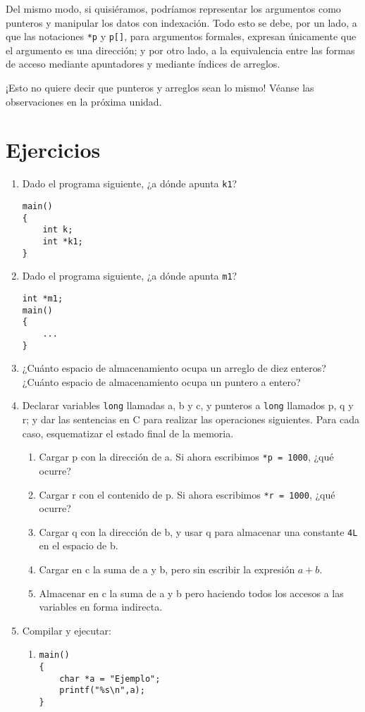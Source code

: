 Del mismo modo, si quisiéramos, podríamos representar los argumentos como
punteros y manipular los datos con indexación. Todo esto se debe, por un lado,
a que las notaciones \texttt{*p} y \texttt{p[]}, para argumentos formales, expresan únicamente que
el argumento es una dirección; y por otro lado, a la equivalencia entre las
formas de acceso mediante apuntadores y mediante índices de arreglos.

¡Esto no quiere decir que punteros y arreglos sean lo mismo! Véanse las
observaciones en la próxima unidad.

\section{Ejercicios}

\begin{enumerate}
	\item Dado el programa siguiente, ¿a dónde apunta \texttt{k1}?
\begin{lstlisting}
main()
{
    int k;
    int *k1;
}
\end{lstlisting}
	\item Dado el programa siguiente, ¿a dónde apunta \texttt{m1}?
\begin{lstlisting}
int *m1;
main()
{
    ...
}	
\end{lstlisting}
	\item ¿Cuánto espacio de almacenamiento ocupa un arreglo de diez enteros? ¿Cuánto
espacio de almacenamiento ocupa un puntero a entero?
	\item Declarar variables \texttt{long} llamadas a, b y c, y punteros a \texttt{long} llamados p, q y r; y dar
las sentencias en C para realizar las operaciones siguientes. Para cada caso,
esquematizar el estado final de la memoria.
	\begin{enumerate}[label=\alph*.]
		\item Cargar p con la dirección de a. Si ahora escribimos \lstinline{*p = 1000}, ¿qué
      ocurre?
		\item Cargar r con el contenido de p. Si ahora escribimos \lstinline{*r = 1000}, ¿qué
      ocurre?
		\item Cargar q con la dirección de b, y usar q para almacenar una constante \texttt{4L}
      en el espacio de b.
		\item Cargar en c la suma de a y b, pero sin escribir la expresión $a+b$.
		\item Almacenar en c la suma de a y b pero haciendo todos los accesos a las
      variables en forma indirecta.
	\end{enumerate}
\item Compilar y ejecutar:
\begin{enumerate}[label=\alph*.]
		\item 
\begin{lstlisting}
main()
{
    char *a = "Ejemplo";
    printf("%s\n",a);
}
\end{lstlisting}


\end{enumerate}
\end{enumerate}

